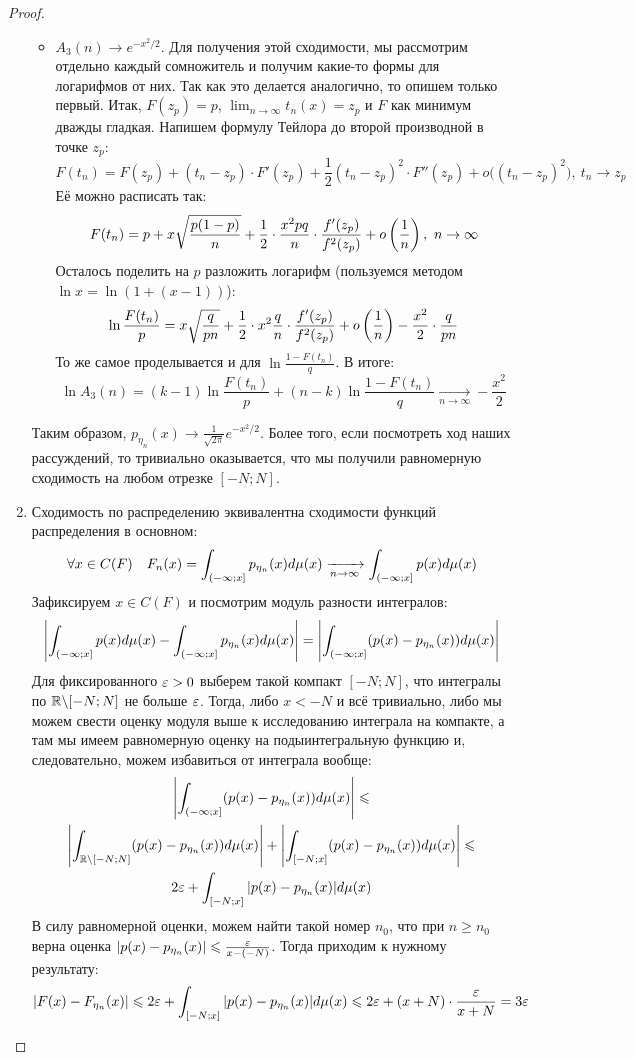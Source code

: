 \begin{proof}
\begin{enumerate}
\begin{itemize}
			\item $A_3(n) \to e^{-x^2 / 2}$. Для получения этой сходимости, мы рассмотрим отдельно каждый сомножитель и получим какие-то формы для логарифмов от них. Так как это делается аналогично, то опишем только первый. Итак, $F(z_p) = p$, $\lim_{n \to \infty} t_n(x) = z_p$ и $F$ как минимум дважды гладкая. Напишем формулу Тейлора до второй производной в точке $z_p$:
			\[
				F(t_n) = F(z_p) + (t_n - z_p) \cdot F'(z_p) + \frac{1}{2}(t_n - z_p)^2 \cdot F''(z_p) + o\big((t_n - z_p)^2\big),\ t_n \to z_p
			\]
			Её можно расписать так:
			\[
				F(t_n) = p + x\sqrt{\frac{p(1 - p)}{n}} + \frac{1}{2} \cdot \frac{x^2pq}{n} \cdot \frac{f'(z_p)}{f^2(z_p)} + o\left(\frac{1}{n}\right),\ n \to \infty
			\]
			Осталось поделить на $p$ разложить логарифм (пользуемся методом $\ln x = \ln(1 + (x - 1))$):
			\[
				\ln \frac{F(t_n)}{p} = x\sqrt{\frac{q}{pn}} + \frac{1}{2} \cdot x^2\frac{q}{n} \cdot \frac{f'(z_p)}{f^2(z_p)} + o\left(\frac{1}{n}\right) - \frac{x^2}{2} \cdot \frac{q}{pn}
			\]
			То же самое проделывается и для $\ln \frac{1 - F(t_n)}{q}$. В итоге:
			\[
				\ln A_3(n) = (k - 1)\ln \frac{F(t_n)}{p} + (n - k)\ln \frac{1 - F(t_n)}{q} \xrightarrow[n \to \infty]{} -\frac{x^2}{2}
			\]
		\end{itemize}
		Таким образом, $p_{\eta_n}(x) \to \frac{1}{\sqrt{2\pi}} e^{-x^2 / 2}$. Более того, если посмотреть ход наших рассуждений, то тривиально оказывается, что мы получили равномерную сходимость на любом отрезке $[-N; N]$.
		
		\item Сходимость по распределению эквивалентна сходимости функций распределения в основном:
		\[
			\forall x \in C(F)\quad F_n(x) = \int_{\left(-\infty; x\right]} p_{\eta_n}(x)d\mu(x) \xrightarrow[n \to \infty]{} \int_{\left(-\infty; x\right]} p(x)d\mu(x)
		\]
		Зафиксируем $x \in C(F)$ и посмотрим модуль разности интегралов:
		\[
			\left|\int_{\left(-\infty; x\right]} p(x)d\mu(x) - \int_{\left(-\infty; x\right]} p_{\eta_n}(x)d\mu(x)\right| = \left|\int_{\left(-\infty; x\right]} (p(x) - p_{\eta_n}(x))d\mu(x)\right|
		\]
		Для фиксированного $\varepsilon > 0$ выберем такой компакт $[-N; N]$, что интегралы по $\mathbb{R} \backslash [-N; N]$ не больше $\varepsilon$. Тогда, либо $x < -N$ и всё тривиально, либо мы можем свести оценку модуля выше к исследованию интеграла на компакте, а там мы имеем равномерную оценку на подыинтегральную функцию и, следовательно, можем избавиться от интеграла вообще:
		\begin{multline*}
			\left|\int_{\left(-\infty; x\right]} (p(x) - p_{\eta_n}(x))d\mu(x)\right| \leqslant
			\\
			\left|\int_{\mathbb{R} \backslash [-N; N]} (p(x) - p_{\eta_n}(x))d\mu(x)\right| + \left|\int_{[-N; x]} (p(x) - p_{\eta_n}(x))d\mu(x)\right| \leqslant
			\\
			2\varepsilon + \int_{[-N; x]} |p(x) - p_{\eta_n}(x)|d\mu(x)
		\end{multline*}
		В силу равномерной оценки, можем найти такой номер $n_0$, что при $n \ge n_0$ верна оценка $|p(x) - p_{\eta_n}(x)| \leqslant \frac{\varepsilon}{x - (-N)}$. Тогда приходим к нужному результату:
		\[
			\left|F(x) - F_{\eta_n}(x)\right| \leqslant 2\varepsilon + \int_{[-N; x]} |p(x) - p_{\eta_n}(x)|d\mu(x) \leqslant 2\varepsilon + (x + N) \cdot \frac{\varepsilon}{x + N} = 3\varepsilon
		\]
	\end{enumerate}
\end{proof}